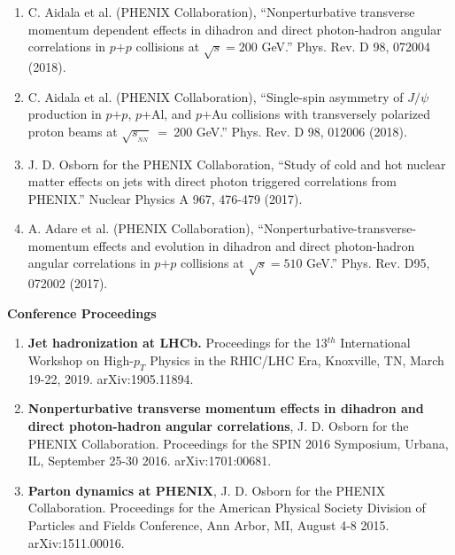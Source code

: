 \documentclass[11pt]{article}
\newcommand{\snn}{\sqrt{s_{_{NN}}}}
\begin{document}
\begin{flushleft}
\begin{center}
\begin{enumerate}
	\item C. Aidala et al. (PHENIX Collaboration), ``Nonperturbative transverse momentum dependent effects in dihadron and direct photon-hadron angular correlations in $p$$+$$p$ collisions at $\sqrt{s}=200$ GeV.'' Phys. Rev. D 98, 072004 (2018).
		
		
	\item C. Aidala et al. (PHENIX Collaboration), ``Single-spin asymmetry of $J/\psi$ production in $p$$+$$p$, $p$+Al, and $p$$+$Au collisions with transversely polarized proton beams at $\snn$~=~200 GeV.'' Phys. Rev. D 98, 012006 (2018).
	
	\item J. D. Osborn for the PHENIX Collaboration, ``Study of cold and hot nuclear matter effects on jets with direct photon triggered correlations from PHENIX.'' Nuclear Physics A 967, 476-479 (2017).
	
	\item A. Adare et al. (PHENIX Collaboration), ``Nonperturbative-transverse-momentum effects and evolution in dihadron and direct photon-hadron angular correlations in $p$$+$$p$ collisions at $\sqrt{s}=510$ GeV.''  Phys. Rev. D95, 072002 (2017).
	
\end{enumerate}
\end{center}
\end{flushleft}









\vspace{0.5cm}
\begin{flushleft}
	\Large\textbf{Conference Proceedings} \\
	\normalsize 
	\begin{enumerate}
		\item \textbf{Jet hadronization at LHCb.} Proceedings for the 13$^{th}$ International Workshop on High-$p_T$ Physics in the RHIC/LHC Era, Knoxville, TN, March 19-22, 2019. arXiv:1905.11894.
		\item \textbf{Nonperturbative transverse momentum effects in dihadron and direct photon-hadron angular correlations}, J. D. Osborn for the PHENIX Collaboration. Proceedings for the SPIN 2016 Symposium, Urbana, IL, September 25-30 2016. arXiv:1701:00681.
		\item \textbf{Parton dynamics at PHENIX}, J. D. Osborn for the PHENIX Collaboration. Proceedings for the American Physical Society Division of Particles and Fields Conference, Ann Arbor, MI, August 4-8 2015. arXiv:1511.00016. 
		
	\end{enumerate}
\end{flushleft}
\end{document}

